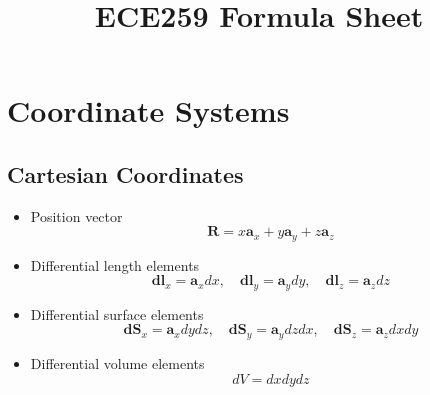 \documentclass{article}
\title{ECE259 Formula Sheet}
\begin{document}
    \section{Coordinate Systems}
    \subsection{Cartesian Coordinates}
    \begin{definition}
        \begin{itemize}
            \item Position vector
            \begin{equation}
                \mathbf{R} = x \mathbf{a}_x + y \mathbf{a}_y + z \mathbf{a}_z
            \end{equation}
            \item Differential length elements
            \begin{equation}
                \mathbf{dl}_x = \mathbf{a}_x dx, \quad \mathbf{dl}_y = \mathbf{a}_y dy, \quad \mathbf{dl}_z = \mathbf{a}_z dz
            \end{equation}
            \item Differential surface elements 
            \begin{equation}
                \mathbf{dS}_x = \mathbf{a}_x dy dz, \quad \mathbf{dS}_y = \mathbf{a}_y dz dx, \quad \mathbf{dS}_z = \mathbf{a}_z dx dy
            \end{equation}
            \item Differential volume elements
            \begin{equation}
                dV = dx dy dz
            \end{equation}
        \end{itemize}
    \end{definition}
\end{document}
